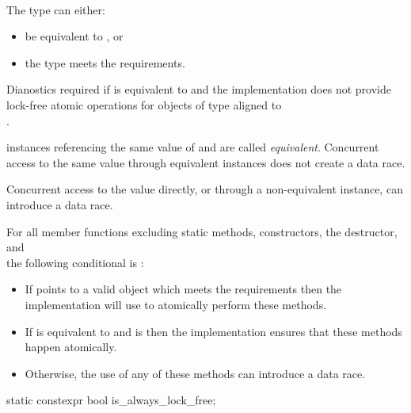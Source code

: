  \\

\begin{addedblock}
\pnum
The type  can either:
\begin{itemize}
\item be equivalent to , or
\item the type  meets the  requirements.  
\end{itemize}
Dianostics required if  is equivalent to  
and the implementation does not provide lock-free atomic
operations for objects of type  aligned to \\
.

\pnum
{} instances referencing the same value of  and  are 
called \textit{equivalent}. Concurrent access to the same value through 
equivalent  instances does not create a data race. 
\begin{note} Concurrent access to the value directly, or through a non-equivalent
 instance, can introduce a data race.
\end{note}

\pnum
For all  member functions excluding static methods, constructors, 
the destructor, and \\  the following conditional is :
\begin{itemize}
\item If  points to a valid  object which meets the 
   requirements then 
  the implementation will use  to atomically perform these methods.
\item If  is equivalent to  and
   is  then
  the implementation ensures that these methods happen atomically.
\item Otherwise, the use of any of these methods can introduce a data race. 
\end{itemize}
\end{addedblock}

\begin{itemdecl}
static constexpr bool is_always_lock_free;
\end{itemdecl}

